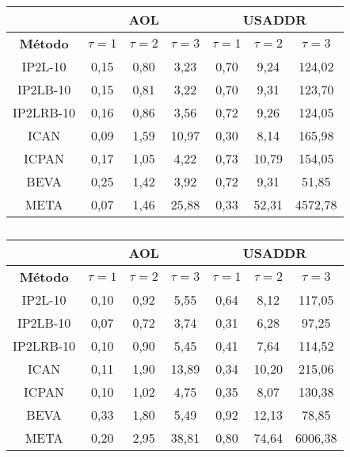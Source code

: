 \begin{table}[]
\centering
\begin{tabular}{c|c|c|c|c|c|c|}
\cline{2-7}
\multicolumn{1}{l|}{} & \multicolumn{3}{c|}{\textbf{AOL}} & \multicolumn{3}{c|}{\textbf{USADDR}} \\ \hline
\multicolumn{1}{|c|}{\textbf{Método}} & $\tau=1$ & $\tau=2$ & $\tau=3$ & $\tau=1$ & $\tau=2$ & $\tau=3$ \\ \hline
\multicolumn{1}{|c|}{IP2L-10} & 0,15 & 0,80 & 3,23 & 0,70 & 9,24 & 124,02 \\ \hline
\multicolumn{1}{|c|}{IP2LB-10} & 0,15 & 0,81 & 3,22 & 0,70 & 9,31 & 123,70 \\ \hline
\multicolumn{1}{|c|}{IP2LRB-10} & 0,16 & 0,86 & 3,56 & 0,72 & 9,26 & 124,05 \\ \hline
\multicolumn{1}{|c|}{ICAN} & 0,09 & 1,59 & 10,97 & 0,30 & 8,14 & 165,98 \\ \hline
\multicolumn{1}{|c|}{ICPAN} & 0,17 & 1,05 & 4,22 & 0,73 & 10,79 & 154,05 \\ \hline
\multicolumn{1}{|c|}{BEVA} & 0,25 & 1,42 & 3,92 & 0,72 & 9,31 & 51,85 \\ \hline
\multicolumn{1}{|c|}{META} & 0,07 & 1,46 & 25,88 & 0,33 & 52,31 & 4572,78 \\ \hline
\end{tabular}
\caption{}
\label{tab:baselines-varying-tau-p-5}
\end{table}


\begin{table}[]
\centering
\begin{tabular}{c|c|c|c|c|c|c|}
\cline{2-7}
 & \multicolumn{3}{c|}{\textbf{AOL}} & \multicolumn{3}{c|}{\textbf{USADDR}} \\ \hline
\multicolumn{1}{|c|}{\textbf{Método}} & $\tau=1$ & $\tau=2$ & $\tau=3$ & $\tau=1$ & $\tau=2$ & $\tau=3$ \\ \hline
\multicolumn{1}{|c|}{IP2L-10} & 0,10 & 0,92 & 5,55 & 0,64 & 8,12 & 117,05 \\ \hline
\multicolumn{1}{|c|}{IP2LB-10} & 0,07 & 0,72 & 3,74 & 0,31 & 6,28 & 97,25 \\ \hline
\multicolumn{1}{|c|}{IP2LRB-10} & 0,10 & 0,90 & 5,45 & 0,41 & 7,64 & 114,52 \\ \hline
\multicolumn{1}{|c|}{ICAN} & 0,11 & 1,90 & 13,89 & 0,34 & 10,20 & 215,06 \\ \hline
\multicolumn{1}{|c|}{ICPAN} & 0,10 & 1,02 & 4,75 & 0,35 & 8,07 & 130,38 \\ \hline
\multicolumn{1}{|c|}{BEVA} & 0,33 & 1,80 & 5,49 & 0,92 & 12,13 & 78,85 \\ \hline
\multicolumn{1}{|c|}{META} & 0,20 & 2,95 & 38,81 & 0,80 & 74,64 & 6006,38 \\ \hline
\end{tabular}
\caption{}
\label{tab:baselines-varying-tau-p-13}
\end{table}

